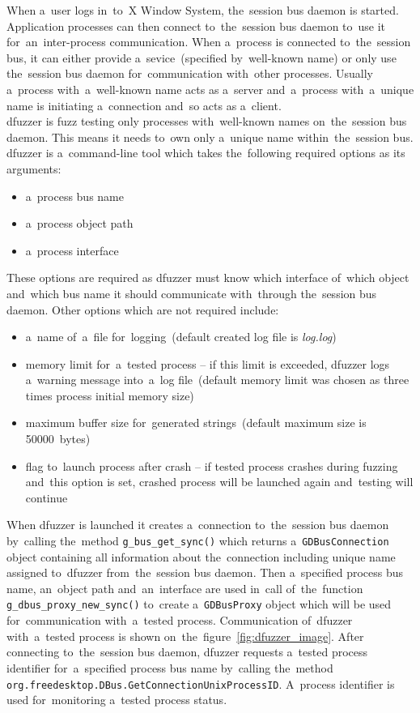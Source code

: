 When a~user logs in~to~X Window System, the~session bus daemon is started. Application
processes can then connect to~the~session bus daemon to~use it
for~an~\mbox{inter-process} communication. When a~process is connected to~the~session
bus, it can either provide a~sevice~(specified by~well-known name) or only use
the~session bus daemon for~communication with~other processes. Usually a~process
with~a~well-known name acts as a~server and~a~process with~a~unique name is
initiating a~connection and~so acts as a~client.\\

dfuzzer is fuzz testing only processes with~well-known names on~the~session bus
daemon. This means it needs to~own only a~unique name within~the~session bus.
dfuzzer is a~command-line tool which takes the~following required options as its
arguments:

\begin{itemize}
	\item a~process bus name
	\item a~process object path
	\item a~process interface
\end{itemize}

These options are required as dfuzzer must know which interface of~which object
and~which bus name it should communicate with~through the~session bus daemon.
Other options which are not required include:

\begin{itemize}
	\item a~name of~a~file for~logging~(default created log file is \emph{log.log})
	\item memory limit for~a~tested process -- if this limit is exceeded,
		dfuzzer logs a~warning message into~a~log file~(default memory limit
		was chosen as three times process initial memory size)
	\item maximum buffer size for~generated strings~(default maximum size
		is 50000~bytes)
	\item flag to~launch process after crash -- if tested process crashes during
		fuzzing and~this option is set, crashed process will be launched again
		and~testing will continue
\end{itemize}

When dfuzzer is launched it creates a~connection to~the~session bus daemon
by~calling the~method \texttt{g\_bus\_get\_sync()} which returns
a~\texttt{GDBusConnection} object containing all information about the~connection
including unique name assigned to~dfuzzer from~the~session bus daemon. Then
a~specified process bus name, an~object path and~an~interface are used in~call
of~the~function \texttt{g\_dbus\_proxy\_new\_sync()} to~create a~\texttt{GDBusProxy}
object which will be used for~communication with~a~tested process. Communication
of~dfuzzer with~a~tested process is shown on~the~figure~\ref{fig:dfuzzer_image}.
After connecting to~the~session bus \mbox{daemon}, dfuzzer requests a~tested process
identifier for~a~specified process bus name by~calling the~method
\texttt{org.freedesktop.DBus.GetConnectionUnixProcessID}. A~process identifier
is used for~monitoring a~tested process status.\\


